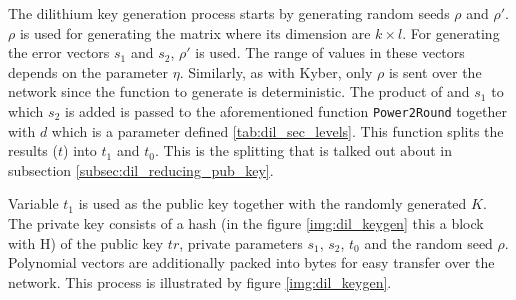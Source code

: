 The dilithium key generation process starts by generating random seeds $\rho$ and $\rho'$. $\rho$ is used for generating the matrix  where its dimension are $k\times l$. For generating the error vectors $s_1$ and $s_2$, $\rho'$ is used. The range of values in these vectors depends on the parameter $\eta$. Similarly, as with Kyber, only $\rho$ is sent over the network since the function to generate  is deterministic. The product of  and $s_1$ to which $s_2$ is added is passed to the aforementioned function \texttt{Power2Round} together with $d$ which is a parameter defined \ref{tab:dil_sec_levels}. This function splits the results ($t$) into $t_1$ and $t_0$. This is the splitting that is talked out about in subsection \ref{subsec:dil_reducing_pub_key}.

Variable $t_1$ is used as the public key together with the randomly generated $K$. The private key consists of a hash (in the figure \ref{img:dil_keygen} this a block with H) of the public key $tr$, private parameters $s_1$, $s_2$, $t_0$ and the random seed $\rho$. Polynomial vectors are additionally packed into bytes for easy transfer over the network. This process is illustrated by figure \ref{img:dil_keygen}.

